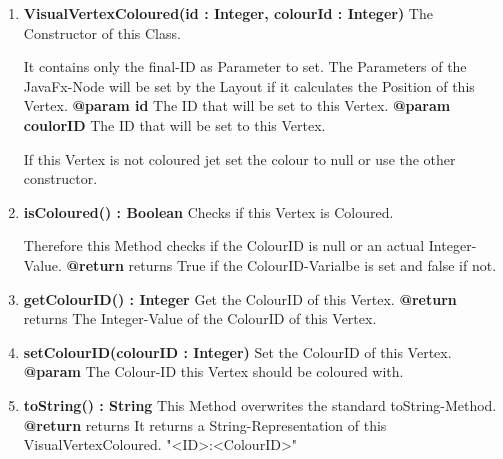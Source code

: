 \documentclass{article}
\begin{document}
				\begin{enumerate}[+]
					\item{
						\textbf{VisualVertexColoured(id : Integer, colourId : Integer)} \newline
						The Constructor of this Class.
						
						It contains only the final-ID as Parameter to set.
						The Parameters of the JavaFx-Node will be set by the Layout if it calculates the Position of this Vertex.
						\newline
						\textbf{@param id}
							The ID that will be set to this Vertex.
							\newline
						\textbf{@param coulorID}
							The ID that will be set to this Vertex.
							
							If this Vertex is not coloured jet set the colour to null or use the other constructor.
							\newline
					}
					\item{
						\textbf{isColoured() : Boolean} \newline
						Checks if this Vertex is Coloured.
						
						Therefore this Method checks if the ColourID is null or an actual Integer-Value.
						\newline
						\textbf{@return} returns
							True if the ColourID-Varialbe is set and false if not.
							\newline
					}
					\item{
						\textbf{getColourID() : Integer} \newline
						Get the ColourID of this Vertex.
						\newline
						\textbf{@return} returns
							The Integer-Value of the ColourID of this Vertex.
							\newline
					}
					\item{
						\textbf{setColourID(colourID : Integer)} \newline
						Set the ColourID of this Vertex.
						\newline
						\textbf{@param}
							The Colour-ID this Vertex should be coloured with.
							\newline
					}
					\item{
						\textbf{toString() : String} \newline
						This Method overwrites the standard toString-Method.
						\newline
						\textbf{@return} returns
							It returns a String-Representation of this VisualVertexColoured.
							"<ID>:<ColourID>"
							\newline
					}
				\end{enumerate}	
			
\end{document}
